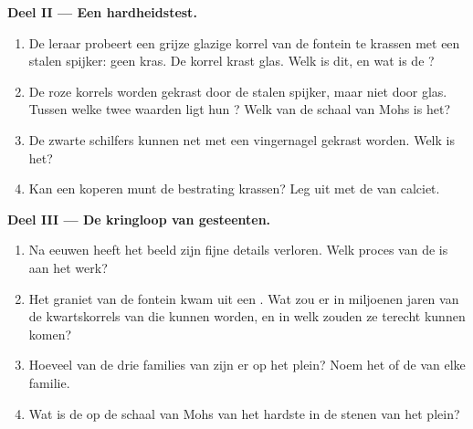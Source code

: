 \begin{problem}
\medskip
\noindent\textbf{Deel II --- Een hardheidstest.}
\begin{enumerate}[resume]
  \item De leraar probeert een grijze glazige korrel van de fontein te
        krassen met een stalen spijker: geen kras. De korrel krast glas.
        Welk  is dit, en wat is de ?
  \item De roze korrels worden gekrast door de stalen spijker, maar niet
        door glas. Tussen welke twee waarden ligt hun ? Welk
         van de schaal van Mohs is het?
  \item De zwarte schilfers kunnen net met een vingernagel gekrast worden.
        Welk  is het?
  \item Kan een koperen munt de bestrating krassen? Leg uit met de
         van calciet.
\end{enumerate}

\medskip
\noindent\textbf{Deel III --- De kringloop van gesteenten.}
\begin{enumerate}[resume]
  \item Na eeuwen  heeft het beeld zijn fijne details verloren. Welk
        proces van de  is aan het werk?
  \item Het graniet van de fontein kwam uit een . Wat zou er in
        miljoenen jaren van de kwartskorrels van die  kunnen worden, en
        in welk  zouden ze terecht kunnen komen?
  \item Hoeveel van de drie families van  zijn er op het plein?
        Noem het  of de  van elke familie.
  \item Wat is de  op de schaal van Mohs van het hardste 
        in de stenen van het plein?
\end{enumerate}
\end{problem}
